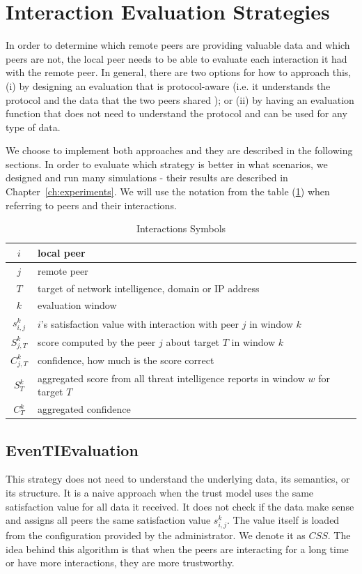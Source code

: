 \section{Interaction Evaluation Strategies}
\label{sec:interaction-evaluation-strategies}
In order to determine which remote peers are providing valuable data and which peers are not, the local peer needs to be able to evaluate each interaction it had with the remote peer.
In general, there are two options for how to approach this, (i) by designing an evaluation that is protocol-aware (i.e. it understands the protocol and the data that the two peers shared ); or (ii) by having an evaluation function that does not need to understand the protocol and can be used for any type of data.

We choose to implement both approaches and they are described in the following sections. In order to evaluate which strategy is better in what scenarios, we designed and run many simulations - their results are described in Chapter~\ref{ch:experiments}. 
We will use the notation from the table (\ref{table:interaction-eval})  when referring to peers and their interactions.

\begin{table}[h!]
\centering
\begin{tabular}{ c | m{20em} }
 $i$ & local peer \\
 \hline
 $j$ & remote peer \\
 \hline
 $T$ & target of network intelligence, domain or IP address \\
 \hline
 $k$ & evaluation window \\
 \hline
 $s^{k}_{i, j}$ & $i$'s satisfaction value with interaction with peer $j$ in window $k$\\
 \hline
 $S^{k}_{j, T}$ & score computed by the peer $j$ about target $T$ in window $k$ \\
 \hline
 $C^{k}_{j, T}$ & confidence, how much is the score correct \\
 \hline
 $S^{k}_{T}$ & aggregated score from all threat intelligence reports in window $w$ for target $T$ \\
 \hline
 $C^{k}_{T}$ & aggregated confidence
\end{tabular}
\caption{Interactions Symbols}
\label{table:interaction-eval}
\end{table}

\subsection{EvenTIEvaluation}
\label{subsec:same-eval-for-all-interactions}
This strategy does not need to understand the underlying data, its semantics, or its structure.
It is a naive approach when the trust model uses the same satisfaction value for all data it received. It does not check if the data make sense and assigns all peers the same satisfaction value $s^{k}_{i, j}$.
The value itself is loaded from the configuration provided by the administrator. We denote it as $CSS$. 
The idea behind this algorithm is that when the peers are interacting for a long time or have more interactions, they are more trustworthy.

